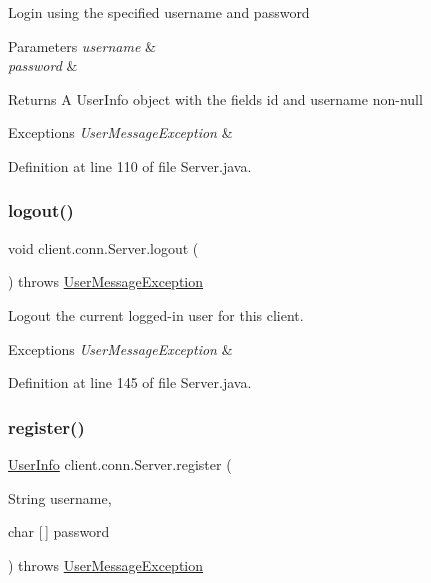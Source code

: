 Login using the specified username and password 
\begin{DoxyParams}{Parameters}
{\em username} & \\
\hline
{\em password} & \\
\hline
\end{DoxyParams}
\begin{DoxyReturn}{Returns}
A {\ttfamily User\+Info} object with the fields {\ttfamily id} and {\ttfamily username} non-\/null 
\end{DoxyReturn}

\begin{DoxyExceptions}{Exceptions}
{\em User\+Message\+Exception} & \\
\hline
\end{DoxyExceptions}


Definition at line 110 of file Server.\+java.

\hypertarget{classclient_1_1conn_1_1_server_af45689754d02a83d53602d01a9bf2427}{}\label{classclient_1_1conn_1_1_server_af45689754d02a83d53602d01a9bf2427} 
\subsubsection{\texorpdfstring{logout()}{logout()}}
{\footnotesize\ttfamily void client.\+conn.\+Server.\+logout (\begin{DoxyParamCaption}{ }\end{DoxyParamCaption}) throws \hyperlink{classsharedlib_1_1exceptions_1_1_user_message_exception}{User\+Message\+Exception}}

Logout the current logged-\/in user for this client. 
\begin{DoxyExceptions}{Exceptions}
{\em User\+Message\+Exception} & \\
\hline
\end{DoxyExceptions}


Definition at line 145 of file Server.\+java.

\hypertarget{classclient_1_1conn_1_1_server_a945189dab00f6350cb5a444a910c4dd5}{}\label{classclient_1_1conn_1_1_server_a945189dab00f6350cb5a444a910c4dd5} 
\subsubsection{\texorpdfstring{register()}{register()}}
{\footnotesize\ttfamily \hyperlink{classsharedlib_1_1tuples_1_1_user_info}{User\+Info} client.\+conn.\+Server.\+register (\begin{DoxyParamCaption}\item[{String}]{username,  }\item[{char \mbox{[}$\,$\mbox{]}}]{password }\end{DoxyParamCaption}) throws \hyperlink{classsharedlib_1_1exceptions_1_1_user_message_exception}{User\+Message\+Exception}}

